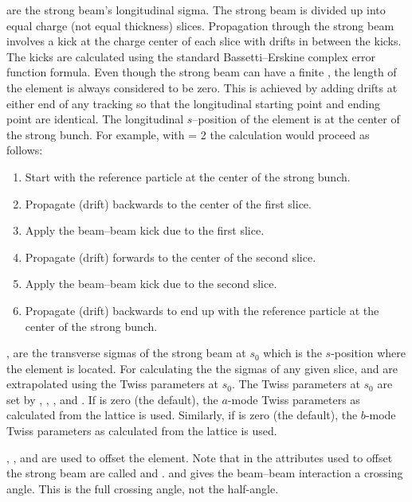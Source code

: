  are the strong beam's longitudinal sigma.
The strong beam is divided up into  equal charge (not
equal thickness) slices. Propagation through the strong beam involves
a kick at the charge center of each slice with drifts in between the
kicks. The kicks are calculated using the standard Bassetti--Erskine
complex error function formula\cite{b:talman}.  Even though the strong
beam can have a finite , the length of the element is always
considered to be zero. This is achieved by adding drifts at either end
of any tracking so that the longitudinal starting point and ending
point are identical. The longitudinal $s$--position of the
 element is at the center of the strong bunch. For
example, with  = 2 the calculation would proceed as
follows:
\begin{enumerate}
  \item  Start with the reference particle at the center of the strong bunch.
  \item  Propagate (drift) backwards to the center of the first slice.
  \item  Apply the beam--beam kick due to the first slice.
  \item  Propagate (drift) forwards to the center of the second slice.
  \item  Apply the beam--beam kick due to the second slice.
  \item  Propagate (drift) backwards to end up with the reference particle
     at the center of the strong bunch.
\end{enumerate}

,  are the transverse sigmas of the strong beam
at $s_0$ which is the $s$-position where the  element is located. 
For calculating the the sigmas of any given slice,  and  
are extrapolated using the Twiss parameters at $s_0$. The Twiss parameters
at $s_0$ are set by , , , and .
If  is zero (the default), the $a$-mode Twiss parameters as 
calculated from the lattice is used. Similarly, 
if  is zero (the default), the $b$-mode Twiss parameters as 
calculated from the lattice is used.


, , and  are used to offset the
 element. Note that in \mad the attributes used to
offset the strong beam are called  and .
 and  gives the beam--beam interaction a
crossing angle. This is the full crossing angle, not the half-angle.

